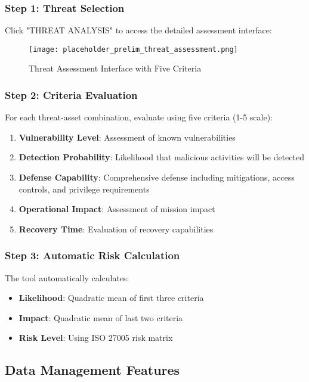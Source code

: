 \documentclass[binding=0.6cm]{sapthesis}
\begin{document}
\subsubsection{Step 1: Threat Selection}
Click "THREAT ANALYSIS" to access the detailed assessment interface:

\begin{figure}[H]
    \centering
    \texttt{[image: placeholder\_prelim\_threat\_assessment.png]}
    \caption{Threat Assessment Interface with Five Criteria}
    \label{fig:prelim_threat_assessment}
\end{figure}

\subsubsection{Step 2: Criteria Evaluation}
For each threat-asset combination, evaluate using five criteria (1-5 scale):
\begin{enumerate}
    \item \textbf{Vulnerability Level}: Assessment of known vulnerabilities
    \item \textbf{Detection Probability}: Likelihood that malicious activities will be detected
    \item \textbf{Defense Capability}: Comprehensive defense including mitigations, access controls, and privilege requirements
    \item \textbf{Operational Impact}: Assessment of mission impact
    \item \textbf{Recovery Time}: Evaluation of recovery capabilities
\end{enumerate}

\subsubsection{Step 3: Automatic Risk Calculation}
The tool automatically calculates:
\begin{itemize}
    \item \textbf{Likelihood}: Quadratic mean of first three criteria
    \item \textbf{Impact}: Quadratic mean of last two criteria
    \item \textbf{Risk Level}: Using ISO 27005 risk matrix
\end{itemize}

\subsection{Data Management Features}
\end{document}
